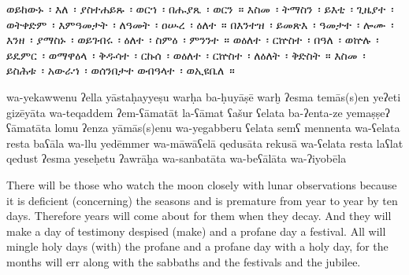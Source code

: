\begin{ethiopictext}
    ወይከውኑ~፡ እለ~፡ ያስተሐይጹ~፡ ወርኀ~፡
    በሑያጼ~፡ ወርን~። እስመ~፡ ትማስን~፡ ይእቲ~፡ ጊዜያተ~፡ ወትቀድም~፡
    እምዓመታት~፡ ለዓመት~፡ ዐሡረ~፡ ዕለተ~።
    በእንተዝ~፡ ይመጽእ~፡
    ዓመታተ~፡ ሎሙ~፡ እንዘ~፡ ያማስኑ~፡ ወይገብሩ~፡ ዕለተ~፡ ስምዕ~፡
    ምንንተ~። ወዕለተ~፡ ርኵስተ~፡ በዓለ~፡ ወኵሉ~፡ ይዴምር~፡ ወማዋዕላ~፡ 
    ቅዱሳተ~፡ ርኩሰ~፡ ወዕለተ~፡ ርኵስተ~፡ ለዕለት~፡ ቅድስት~። እስመ~፡
    ይስሕቱ~፡ አውራኀ~፡ ወሰንበታተ ወብዓላተ~፡ ወኢዩቤለ~።
\end{ethiopictext}
\begin{transliteration}
    wa-yekawwenu ʔella yāstaḥayyeṣu warḥa 
    ba-ḥuyāṣē warḫ ʔesma temās(s)en yeʔeti gizēyāta wa-teqaddem 
    ʔem-ʕāmatāt la-ʕāmat ʕašur ʕelata
    ba-ʔenta-ze yemaṣṣeʔ 
    ʕāmatāta lomu ʔenza yāmās(s)enu wa-yegabberu ʕelata semʕ 
    mennenta wa-ʕelata resta baʕāla wa-llu yedēmmer wa-māwāʕelā 
    qedusāta rekusā wa-ʕelata resta laʕlat qedust ʔesma
    yeseḥetu ʔawrāḫa wa-sanbatāta wa-beʕālāta wa-ʔiyobēla
\end{transliteration}
\begin{translation}
    There will be those who watch the moon closely with lunar observations
    because it is deficient (concerning) the seasons and is premature from year to year by ten days. 
    Therefore
    years will come about for them when they decay. And they will make a day of
    testimony despised (make) and a profane day a festival. All will mingle holy days
    (with) the profane and a profane day with a holy day, for
    the months will err along with the sabbaths and the festivals and the jubilee.
\end{translation}